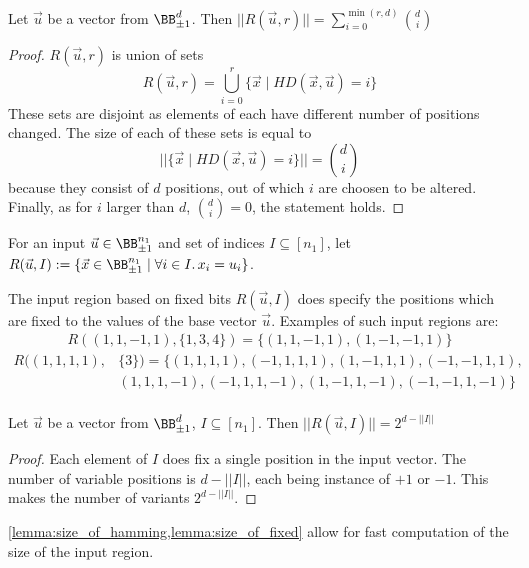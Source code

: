 \begin{lemma}{Let $\vec u$ be a vector from $\BB^{d}_{\pm 1}$.
    Then $||R(\vec u, r)|| = \sum_{i=0}^{\min(r, d)} {d\choose i}$}%
    \label{lemma:size_of_hamming}%
    \begin{proof}
        $R(\vec u, r)$ is union of sets
        \begin{equation*}
            R(\vec u, r) = \bigcup_{i=0}^{r} \{\vec x \mid HD(\vec x, \vec u) = i\}
        \end{equation*}
        These sets are disjoint as elements of each have different number
        of positions changed. The size of each of these sets is equal to
        \begin{equation*}
            ||\{\vec x \mid HD(\vec x, \vec u) = i\}|| = {d\choose i}
        \end{equation*}
        because they consist of $d$ positions, out of which $i$ are choosen to be altered.
        Finally, as for $i$ larger than $d$, ${d\choose i}=0$, the statement holds.
    \end{proof}
\end{lemma}

\begin{definition}
    For an input $\vec u\in \BB^{n_1}_{\pm 1}$ and set of indices $I \subseteq [n_1]$, let
    $R(\vec u, I) := \{\vec x\in \BB^{n_1}_{\pm 1} \mid \forall i\in I.\, x_i = u_i \}$.
\end{definition}

The input region based on fixed bits $R(\vec u, I)$ does specify
the positions which are fixed to the values of the base vector $\vec u$.
Examples of such input regions are:
\begin{align*}
    R((1,1,-1,1), \{1,3,4\}) = \{(1,1,-1,1), (1,-1,-1,1)\}
\end{align*}
\begin{align*}
    R((1,1,1,1), &\{3\}) = \{(1,1,1,1), (-1,1,1,1), (1,-1,1,1), (-1,-1,1,1),\\
    &(1,1,1,-1), (-1,1,1,-1), (1,-1,1,-1), (-1,-1,1,-1)\}\\
\end{align*}

\begin{lemma}{Let $\vec u$ be a vector from $\BB^{d}_{\pm 1}$, $I\subseteq [n_1]$.
    Then $||R(\vec u, I)|| = 2^{d-||I||}$}%
    \label{lemma:size_of_fixed}%
    \begin{proof}
        Each element of $I$ does fix a single position in the input vector.
        The number of variable positions is $d-||I||$, each being instance of
        $+1$ or $-1$. This makes the number of variants $2^{d-||I||}$.
    \end{proof}
\end{lemma}

\begin{remark}
    \cref{lemma:size_of_hamming,lemma:size_of_fixed}
    allow for fast computation of the size of the input region.
\end{remark}


